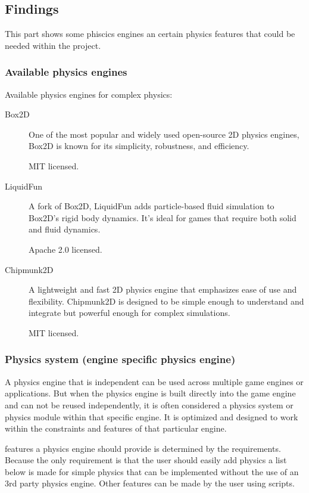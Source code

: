 \documentclass{projdoc}
\begin{document}
\subsection{Findings}

This part shows some phiscics engines an certain physics features that could be
needed within the project.

\subsubsection{Available physics engines}

Available physics engines for complex physics:\noparbreak
\begin{description}
	\item[Box2D] One of the most popular and widely used open-source 2D physics
		engines, Box2D is known for its simplicity, robustness, and efficiency.

		MIT licensed.
	\item[LiquidFun] A fork of Box2D, LiquidFun adds particle-based fluid simulation to
		Box2D's rigid body dynamics. It's ideal for games that require both solid and
		fluid dynamics.

		Apache 2.0 licensed.
	\item[Chipmunk2D] A lightweight and fast 2D physics engine that emphasizes ease of
		use and flexibility. Chipmunk2D is designed to be simple enough to understand and
		integrate but powerful enough for complex simulations.

		MIT licensed.
\end{description}

\subsubsection{Physics system (engine specific physics engine)}

A physics engine that is independent can be used across multiple game engines or
applications. But when the physics engine is built directly into the game engine and
can not be reused independently, it is often considered a physics system or physics
module within that specific engine. It is optimized and designed to work within the
constraints and features of that particular engine.

features a physics engine should provide is determined by the requirements. Because
the only requirement is that the user should easily add physics a list below is made
for simple physics that can be implemented without the use of an 3rd party physics
engine. Other features can be made by the user using scripts.
\end{document}
